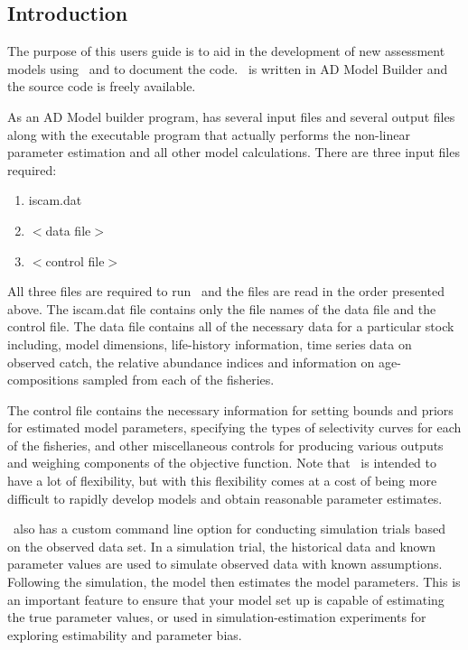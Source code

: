
\setlength{\columnseprule}{1pt}
\setlength{\columnsep}{20pt}

\begin{multicols}{2}
\section{Introduction}
 The purpose of this users guide is to aid in the development of new assessment models using \iscam\ and to document the code. \iscam\ is written in AD Model Builder and the source code is freely available.

As an AD Model builder program, \iscam has several input files and several output files along with the executable program that actually performs the non-linear parameter estimation and all other model calculations.  There are three input files required:
\begin{enumerate}
	\item iscam.dat
	\item $<$data file$>$
	\item $<$control file$>$
\end{enumerate}
 All three files are required to run \iscam\, and the files are read in the order presented above.  The iscam.dat file contains only the file names of the data file and the control file.  The data file contains all of the necessary data for a particular stock including, model dimensions, life-history information, time series data on observed catch, the relative abundance indices and information on age-compositions sampled from each of the fisheries.
 
 The control file contains the necessary information for setting bounds and priors for estimated model parameters, specifying the types of selectivity curves for each of the fisheries, and other miscellaneous controls for producing various outputs and weighing components of the objective function.  Note that \iscam\ is intended to have a lot of flexibility, but with this flexibility comes at a cost of being more difficult to rapidly develop models and obtain reasonable parameter estimates.
 
 \iscam\ also has a custom command line option for conducting simulation trials based on the observed data set. In a simulation trial, the historical data and known parameter values are used to simulate observed data with known assumptions. Following the simulation, the model then estimates the model parameters.   This is an important feature to ensure that your model set up is capable of estimating the true parameter values, or used in simulation-estimation experiments for exploring estimability and parameter bias.
 

\end{multicols}
